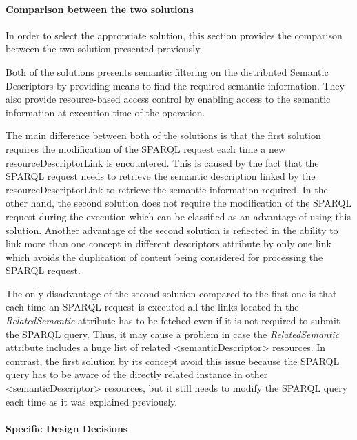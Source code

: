 \paragraph{Comparison between the two solutions}
In order to select the appropriate solution, this section provides the comparison between the two solution presented previously.\par 
Both of the solutions presents semantic filtering on the distributed Semantic Descriptors by providing means to find the required semantic information. They also provide resource-based access control by enabling access to the semantic information at execution time of the operation. \par 
The main difference between both of the solutions is that the first solution requires the modification of the SPARQL request each time a new resourceDescriptorLink is encountered. This is caused by the fact that the SPARQL request needs to retrieve the semantic description linked by the resourceDescriptorLink to retrieve the semantic information required. In the other hand, the second solution does not require the modification of the SPARQL request during the execution which can be classified as an advantage of using this solution. Another advantage of the second solution is reflected in the ability to link more than one concept in different descriptors attribute by only one link which avoids the duplication of content being considered for processing the SPARQL request. \par 
The only disadvantage of the second solution compared to the first one is that each time an SPARQL request is executed all the links located in the \textit{RelatedSemantic} attribute has to be fetched even if it is not required to submit the SPARQL query. Thus, it may cause a problem in case the \textit{RelatedSemantic} attribute includes a huge list of related <semanticDescriptor> resources. In contrast, the first solution by its concept avoid this issue because the SPARQL query has to be aware of the directly related instance in other <semanticDescriptor> resources, but it still needs to modify the SPARQL query each time as it was explained previously.\par


\paragraph{Specific Design Decisions}

